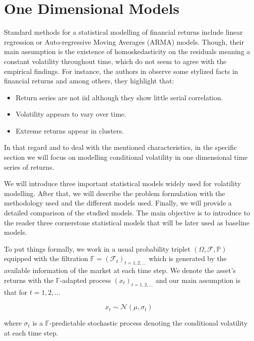 \documentclass[a4paper, oneside]{discothesis}
\begin{document}
\section{One Dimensional Models}\label{one_d}
Standard methods for a statistical modelling of financial returns include linear regression or Auto-regressive Moving Averages (ARMA)  models. Though, their main assumption is the existence of homoskedasticity on the residuals meaning a constant volatility throughout time, which do not seem to agree with the empirical findings. For instance, the authors in \cite{QRM} observe some stylized facts in financial returns and among others, they highlight that:
\begin{itemize}
    \item Return series are not iid although they show little serial correlation.
    \item Volatility appears to vary over time.
    \item  Extreme returns appear in clusters.
\end{itemize}

In that regard and to deal with the mentioned characteristics, in the specific section we will focus on modelling conditional volatility in one dimensional time series of returns.

We will introduce three important statistical models widely used for volatility modelling. After that, we will describe the problem formulation with the methodology used and the different models used. Finally, we will provide a detailed comparison of the studied models. The main objective is to introduce to the reader three cornerstone statistical models that will be later used as baseline models. 

To put things formally, we work in a usual probability triplet $\left( \Omega, \mathcal{F}, \mathbb{P}\right)$ equipped with the filtration $\mathbb{F} = \left(\mathcal{F}_t\right)_{t = 1, 2, \dots}$ which is generated by the available information of the market at each time step. We denote the asset's returns with the $\mathbb{F}$-adapted process  $\left(x_t\right)_{t = 1, 2, \dots}$ and our main assumption is that for $t = 1,2,\dots$ 

\begin{equation}\label{eq:1d-ass}
x_t \sim \mathcal{N}\left(\mu, \sigma_t\right)
\end{equation}

where $\sigma_t$ is a $\mathbb{F}$-predictable stochastic process denoting the conditional volatility at each time step.
\end{document}
